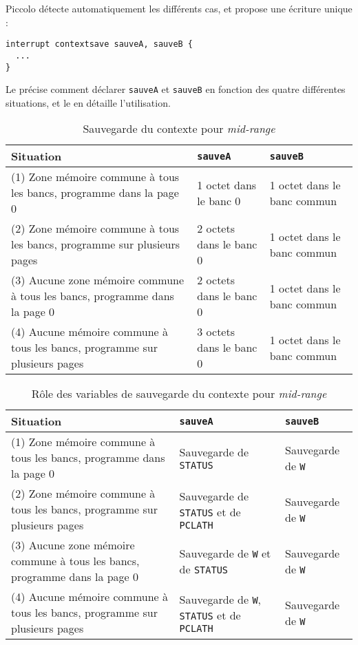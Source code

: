 Piccolo détecte automatiquement les différents cas, et propose une écriture unique :
\begin{lstlisting}[language=piccolo]
interrupt contextsave sauveA, sauveB {
  ...
}
\end{lstlisting}

Le  précise comment déclarer \texttt{sauveA} et \texttt{sauveB} en fonction des quatre différentes situations, et le  en détaille l'utilisation.

\begin{table}[!ht]
  \centering
  \begin{tabular}{p{5cm}p{4cm}p{4cm}}
    \textbf{Situation} & \texttt{\bf sauveA} & \texttt{\bf sauveB}\\
    \hline
    (1) Zone mémoire commune à tous les bancs, programme dans la page 0 & 1 octet dans le banc 0 & 1 octet dans le banc commun\\
    (2) Zone mémoire commune à tous les bancs, programme sur plusieurs pages & 2 octets dans le banc 0 & 1 octet dans le banc commun\\
    (3) Aucune zone mémoire commune à tous les bancs, programme dans la page 0 & 2 octets dans le banc 0 & 1 octet dans le banc commun\\
    (4) Aucune mémoire commune à tous les bancs, programme sur plusieurs pages & 3 octets dans le banc 0 & 1 octet dans le banc commun\\
  \hline
  \end{tabular}
  \caption{Sauvegarde du contexte pour \emph{mid-range}}
\end{table}

\begin{table}[!ht]
  \centering
  \begin{tabular}{p{5cm}p{5cm}l}
    \textbf{Situation} & \texttt{\bf sauveA} & \texttt{\bf sauveB}\\
    \hline
    (1) Zone mémoire commune à tous les bancs, programme dans la page 0 & Sauvegarde de \texttt{STATUS} & Sauvegarde de \texttt{W}\\
    (2) Zone mémoire commune à tous les bancs, programme sur plusieurs pages & Sauvegarde de \texttt{STATUS} et de \texttt{PCLATH} & Sauvegarde de \texttt{W}\\
    (3) Aucune zone mémoire commune à tous les bancs, programme dans la page 0 & Sauvegarde de \texttt{W} et de \texttt{STATUS} & Sauvegarde de \texttt{W}\\
    (4) Aucune mémoire commune à tous les bancs, programme sur plusieurs pages & Sauvegarde de \texttt{W}, \texttt{STATUS} et de \texttt{PCLATH} & Sauvegarde de \texttt{W}\\
  \hline
  \end{tabular}
  \caption{Rôle des variables de sauvegarde du contexte pour \emph{mid-range}}
\end{table}


